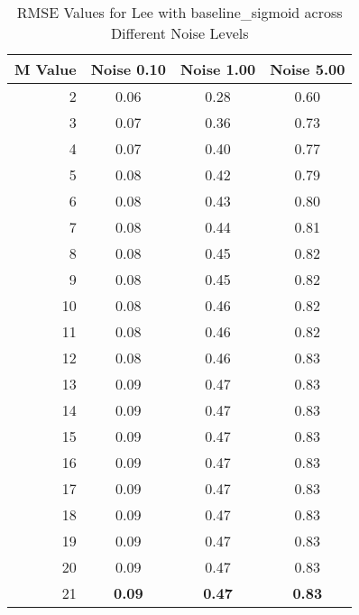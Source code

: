     \begin{table}[htb]
       \small

    \centering 
    \begin{tabular}{|r|ccc|}\hline
   M Value &  Noise 0.10 &  Noise 1.00 &  Noise 5.00 \\ \hline 
      2 &  0.06 &  0.28 &  0.60  \\ \hline 
      3 &  0.07 &  0.36 &  0.73  \\ \hline 
      4 &  0.07 &  0.40 &  0.77  \\ \hline 
      5 &  0.08 &  0.42 &  0.79  \\ \hline 
      6 &  0.08 &  0.43 &  0.80  \\ \hline 
      7 &  0.08 &  0.44 &  0.81  \\ \hline 
      8 &  0.08 &  0.45 &  0.82  \\ \hline 
      9 &  0.08 &  0.45 &  0.82  \\ \hline 
      10 &  0.08 &  0.46 &  0.82  \\ \hline 
      11 &  0.08 &  0.46 &  0.82  \\ \hline 
      12 &  0.08 &  0.46 &  0.83  \\ \hline 
      13 &  0.09 &  0.47 &  0.83  \\ \hline 
      14 &  0.09 &  0.47 &  0.83  \\ \hline 
      15 &  0.09 &  0.47 &  0.83  \\ \hline 
      16 &  0.09 &  0.47 &  0.83  \\ \hline 
      17 &  0.09 &  0.47 &  0.83  \\ \hline 
      18 &  0.09 &  0.47 &  0.83  \\ \hline 
      19 &  0.09 &  0.47 &  0.83  \\ \hline 
      20 &  0.09 &  0.47 &  0.83  \\ \hline 
      21 &  \textbf{0.09} &  \textbf{0.47} &  \textbf{0.83}  \\ \hline 
    \end{tabular}
    \caption{RMSE Values for Lee with baseline_sigmoid across Different Noise Levels}
    \end{table}


